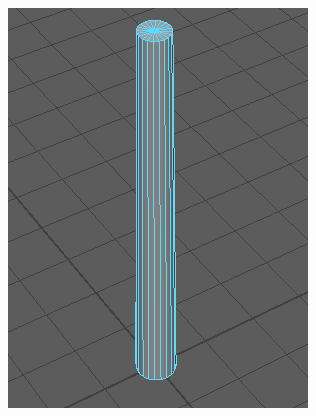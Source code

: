 \setlength{\fwidth}{.3\textwidth}
\begin{figure}[htb]
  \centering
  \begin{subfigure}[b]{\fwidth}
   \includegraphics[width=\textwidth]{figures/edge}
    \label{fig:edge}
  \end{subfigure}
  \hspace{.5 cm}
  \begin{subfigure}[b]{\fwidth}

\end{subfigure}
\end{figure}
